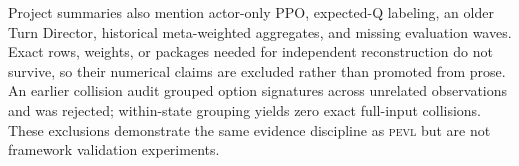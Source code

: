 \documentclass[aps,reprint,superscriptaddress,longbibliography,floatfix]{revtex4-2}
\newcommand{\PEVL}{\textsc{pevl}}
\begin{document}
Project summaries also mention actor-only PPO, expected-Q labeling, an older
Turn Director, historical meta-weighted aggregates, and missing evaluation
waves.  Exact rows, weights, or packages needed for independent reconstruction
do not survive, so their numerical claims are excluded rather than promoted
from prose.  An earlier collision audit grouped option signatures across
unrelated observations and was rejected; within-state grouping yields zero
exact full-input collisions.  These exclusions demonstrate the same evidence
discipline as \PEVL{} but are not framework validation experiments.


\end{document}
